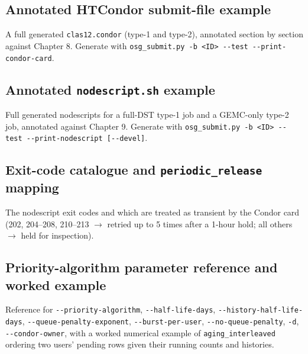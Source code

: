 \subsection{Annotated HTCondor submit-file example}

A full generated \texttt{clas12.\allowbreak{}condor} (type-1 and type-2), annotated section by section against
Chapter 8. Generate with \texttt{osg\_\allowbreak{}submit.\allowbreak{}py -\allowbreak{}b <ID>
-\allowbreak{}-\allowbreak{}test -\allowbreak{}-\allowbreak{}print-\allowbreak{}condor-\allowbreak{}card}.

\subsection{Annotated \texttt{nodescript.\allowbreak{}sh} example}

Full generated nodescripts for a full-DST type-1 job and a GEMC-only type-2 job, annotated against Chapter 9.
Generate with \texttt{osg\_\allowbreak{}submit.\allowbreak{}py -\allowbreak{}b <ID>
-\allowbreak{}-\allowbreak{}test -\allowbreak{}-\allowbreak{}print-\allowbreak{}nodescript
[-\allowbreak{}-\allowbreak{}devel]}.

\subsection{Exit-code catalogue and \texttt{periodic\_\allowbreak{}release} mapping}

The nodescript exit codes and which are treated as transient by the Condor card (202, 204--208, 210--213
$\rightarrow$ retried up to 5 times after a 1-hour hold; all others $\rightarrow$ held for inspection).

\subsection{Priority-algorithm parameter reference and worked example}

Reference for \texttt{-\allowbreak{}-\allowbreak{}priority-\allowbreak{}algorithm},
\texttt{-\allowbreak{}-\allowbreak{}half-\allowbreak{}life-\allowbreak{}days},
\texttt{-\allowbreak{}-\allowbreak{}history-\allowbreak{}half-\allowbreak{}life-\allowbreak{}days},
\texttt{-\allowbreak{}-\allowbreak{}queue-\allowbreak{}penalty-\allowbreak{}exponent},
\texttt{-\allowbreak{}-\allowbreak{}burst-\allowbreak{}per-\allowbreak{}user},
\texttt{-\allowbreak{}-\allowbreak{}no-\allowbreak{}queue-\allowbreak{}penalty}, \texttt{-\allowbreak{}d},
\texttt{-\allowbreak{}-\allowbreak{}condor-\allowbreak{}owner}, with a worked numerical example of
\texttt{aging\_\allowbreak{}interleaved} ordering two users' pending rows given their running counts and
histories.

